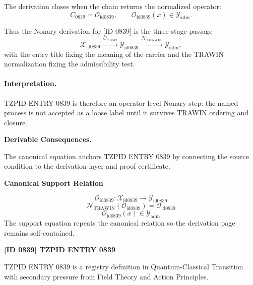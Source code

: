 The derivation closes when the chain returns the normalized operator:\[
C_{0839}=\mathcal{O}_{\mathrm{id0839}},\qquad \mathcal{O}_{\mathrm{id0839}}(x)\in\mathcal{Y}_{\mathrm{adm}}.
\]

Thus the Nonary derivation for [ID 0839] is the three-stage passage
\[
\mathcal{X}_{\mathrm{id0839}}\xrightarrow{\,\mathcal{O}_{\mathrm{id0839}}\,} \mathcal{Y}_{\mathrm{id0839}}\xrightarrow{\,\mathcal{N}_{\mathrm{TRAWIN}}\,} \mathcal{Y}_{\mathrm{adm}},
\]
with the entry title fixing the meaning of the carrier and the TRAWIN normalization fixing the admissibility test.

\paragraph{Interpretation.} TZPID ENTRY 0839 is therefore an operator-level Nonary step: the named process is not accepted as a loose label until it survives TRAWIN ordering and closure.

\par\vspace{0.35em}
\noindent\textbf{Derivable Consequences.}\quad
\begingroup
\footnotesize
\raggedright
The canonical equation anchors TZPID ENTRY 0839 by connecting the source condition to the derivation layer and proof certificate.
\par\endgroup

\noindent\textbf{Canonical Support Relation}\par
\[
\mathcal{O}_{\mathrm{id0839}}:\mathcal{X}_{\mathrm{id0839}}\longrightarrow\mathcal{Y}_{\mathrm{id0839}}
\]
\[
\mathcal{N}_{\mathrm{TRAWIN}}(\mathcal{O}_{\mathrm{id0839}})=\mathcal{O}_{\mathrm{id0839}}
\]
\[
\mathcal{O}_{\mathrm{id0839}}(x)\in\mathcal{Y}_{\mathrm{adm}}
\]
\noindent The support equation repeats the canonical relation so the derivation page remains self-contained.\par

\clearpage
\noindent\textbf{[ID 0839] TZPID ENTRY 0839}\par
\vspace{0.35em}
\begingroup\small
{}
TZPID ENTRY 0839 is a registry definition in Quantum-Classical Transition with secondary pressure from Field Theory and Action Principles.

